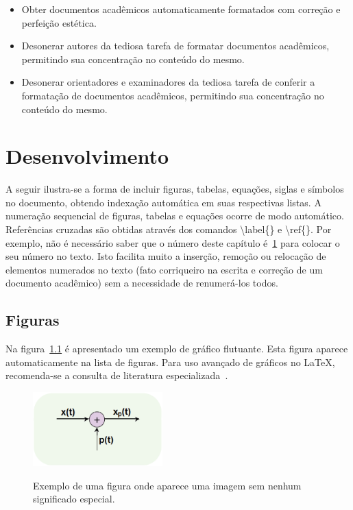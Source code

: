 \documentclass[openright]{normas-utf-tex} %
\begin{document}
\begin{itemize}
	\item Obter documentos acadêmicos automaticamente formatados com correção e perfeição estética.
	\item Desonerar autores da tediosa tarefa de formatar documentos acadêmicos, permitindo sua concentração no conteúdo do mesmo.
	\item Desonerar orientadores e examinadores da tediosa tarefa de conferir a formatação de documentos acadêmicos, permitindo sua concentração no conteúdo do mesmo.
\end{itemize}



\chapter{Desenvolvimento}
\label{chap:desenv}

A seguir ilustra-se a forma de incluir figuras, tabelas, equações, siglas e símbolos no documento, obtendo indexação automática em suas respectivas listas. A numeração sequencial de figuras, tabelas e equações ocorre de modo automático. Referências cruzadas são obtidas através dos comandos {\ttfamily \textbackslash label\{\}} e {\ttfamily \textbackslash ref\{\}}. Por exemplo, não é necessário saber que o número deste capítulo é~\ref{chap:desenv} para colocar o seu número no texto. Isto facilita muito a inserção, remoção ou relocação de elementos numerados no texto (fato corriqueiro na escrita e correção de um documento acadêmico) sem a necessidade de renumerá-los todos.

\section{Figuras}
\label{sec:figuras}

Na figura~\ref{fig:dummy} é apresentado um exemplo de gráfico flutuante. Esta figura aparece automaticamente na lista de figuras. Para uso avançado de gráficos no \LaTeX, recomenda-se a consulta de literatura especializada~\cite{Goossens2007}.

\begin{figure}[!htb]
	\centering
	\caption[Exemplo de uma figura]{Exemplo de uma figura onde aparece uma imagem sem nenhum significado especial.}
	\includegraphics[width=5cm]{./dummy.eps} %
	\label{fig:dummy}
\end{figure}
\end{document}
